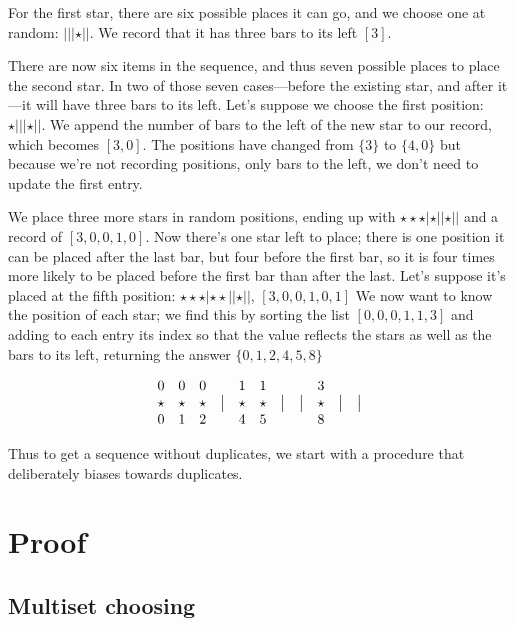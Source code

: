 \documentclass[letterpaper,luatex,11pt]{article}
\begin{document}
For the first star, there are six possible places it can go, and we choose one at random:
\(|||\star||\). We record that it has three bars to its left \([3]\).

There are now six items in the sequence, and thus seven possible places to place the second star.
In two of those seven cases---before the existing star, and after it---it will have three bars
to its left. Let's suppose we choose the first position: \(\star|||\star||\). We append
the number of bars to the left of the new star to our record, which becomes \([3, 0]\).
The positions have changed from \(\{3\}\)
to \(\{4, 0\}\) but because we're not recording positions, only bars to the left, we don't need to
update the first entry.

We place three more stars in random positions, ending up with \(\star\star\star|\star||\star||\)
and a record of \([3, 0, 0, 1, 0]\). Now there's one star left to place; there is one
position it can be placed after the last bar, but four before the first bar, so it is four times
more likely to be placed before the first bar than after the last. Let's suppose it's placed
at the fifth position: \(\star\star\star|\star\star||\star||\), \([3, 0, 0, 1, 0, 1]\) We now
want to know the position of each star; we find this by sorting the list \([0, 0, 0, 1, 1, 3]\)
and adding to each entry its index so that the value reflects the stars as well as the bars to its
left, returning the answer $\{0, 1, 2, 4, 5, 8\}$

\begin{displaymath}
\begin{array}{ c c c c c c c c c c c }
    0 & 0 & 0 & & 1 & 1 & & & 3 & & \\
    \star & \star & \star & \big| & \star & \star & \big| & \big| & \star & \big| & \big| \\
    0 & 1 & 2 & & 4 & 5 & & & 8 & & \\
\end{array}
\end{displaymath}

Thus to get a sequence without duplicates, we start with a procedure that deliberately
biases towards duplicates.

\section{Proof}

\subsection{Multiset choosing}
\end{document}
